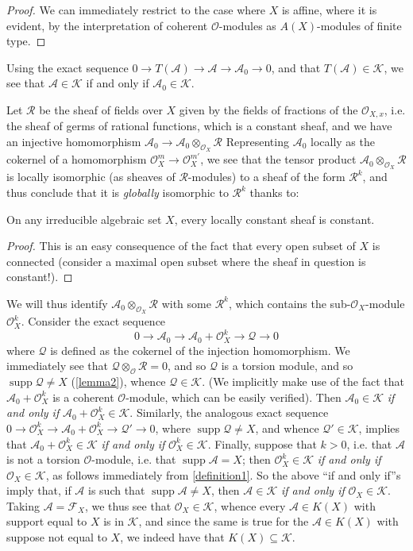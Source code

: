 \documentclass{article}
\theoremstyle{plain}
\newenvironment{lemma}[1]
  {\renewcommand\theinnercustomlemma{#1}\innercustomlemma}
  {\endinnercustomlemma}
\theoremstyle{definition}
\newcommand{\sh}{\mathscr}
\newcommand{\cat}{\mathcal}
\newcommand{\supp}{\operatorname{supp}}
\newcommand{\oldpage}[1]{\marginpar{\footnotesize$\Big\vert$ \textit{p.~#1}}}
\begin{document}
\begin{proof}
  We can immediately restrict to the case where $X$ is affine, where it is evident, by the interpretation of coherent $\sh{O}$-modules as $A(X)$-modules of finite type.
\end{proof}

Using the exact sequence $0\to T(\sh{A})\to \sh{A}\to \sh{A}_0\to 0$, and that $T(\sh{A})\in\cat{K}$, we see that $\sh{A}\in\cat{K}$ if and only if $\sh{A}_0\in\cat{K}$.

Let $\sh{R}$ be the sheaf of fields over $X$ given by the fields of fractions of the $\sh{O}_{X,x}$, i.e. the sheaf of germs of rational functions, which is a constant sheaf, and we have an injective homomorphism $\sh{A}_0\to\sh{A}_0\otimes_{\sh{O}_X}\sh{R}$
Representing $\sh{A}_0$ locally as the cokernel of a homomorphism $\sh{O}_X^m\to\sh{O}_X^{m'}$, we see that the tensor product $\sh{A}_0\otimes_{\sh{O}_X}\sh{R}$ is locally isomorphic (as sheaves of $\sh{R}$-modules) to a sheaf of the form $\sh{R}^k$, and thus conclude that it is \emph{globally} isomorphic to $\sh{R}^k$ thanks to:

\begin{lemma}{3}
\label{lemma3}
  On any irreducible algebraic set $X$, every locally constant sheaf is constant.
\end{lemma}

\begin{proof}
  This is an easy consequence of the fact that every open subset of $X$ is connected (consider a maximal open subset where the sheaf in question is constant!).
\end{proof}

We will thus identify $\sh{A}_0\otimes_{\sh{O}_X}\sh{R}$ with some $\sh{R}^k$, which contains the sub-$\sh{O}_X$-module $\sh{O}_X^k$.
Consider the exact sequence
\[
  0 \to \sh{A}_0 \to \sh{A}_0+\sh{O}_X^k \to \sh{Q} \to 0
\]
where $\sh{Q}$ is defined as the cokernel of the injection homomorphism.
We immediately see that $\sh{Q}\otimes_{\sh{O}}\sh{R}=0$, and so $\sh{Q}$ is a torsion module, and so $\supp\sh{Q}\neq X$ (\cref{lemma2}), whence $\sh{Q}\in\cat{K}$.
(We implicitly make use of the fact that $\sh{A}_0+\sh{O}_X^k$ is a coherent $\sh{O}$-module, which can be easily verified).
Then $\sh{A}_0\in\cat{K}$ \emph{if and only if} $\sh{A}_0+\sh{O}_X^k\in\cat{K}$.
Similarly, the analogous exact sequence
\oldpage{2-04}
$0\to\sh{O}_X^k\to\sh{A}_0+\sh{O}_X^k\to\sh{Q}'\to0$, where $\supp\sh{Q}\neq X$, and whence $\sh{Q}'\in\cat{K}$, implies that $\sh{A}_0+\sh{O}_X^k\in\cat{K}$ \emph{if and only if} $\sh{O}_X^k\in\cat{K}$.
Finally, suppose that $k>0$, i.e. that $\sh{A}$ is not a torsion $\sh{O}$-module, i.e. that $\supp\sh{A}=X$;
then $\sh{O}_X^k\in\cat{K}$ \emph{if and only if} $\sh{O}_X\in\cat{K}$, as follows immediately from \cref{definition1}.
So the above ``if and only if''s imply that, if $\sh{A}$ is such that $\supp\sh{A}\neq X$, then $\sh{A}\in\cat{K}$ \emph{if and only if} $\sh{O}_X\in\cat{K}$.
Taking $\sh{A}=\sh{F}_X$, we thus see that $\sh{O}_X\in\cat{K}$, whence every $\sh{A}\in K(X)$ with support equal to $X$ is in $\cat{K}$, and since the same is true for the $\sh{A}\in K(X)$ with suppose not equal to $X$, we indeed have that $K(X)\subseteq\cat{K}$.
\end{document}
